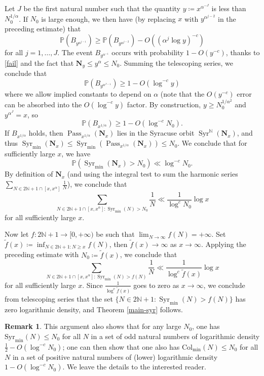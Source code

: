 \documentclass[12pt,a4paper,reqno]{amsart}
\numberwithin{equation}{section}
\theoremstyle{plain}
\theoremstyle{definition}
\newtheorem{remark}[theorem]{Remark}
\renewcommand\P{\mathbb{P}}
\newcommand\N{\mathbb{N}}
\newcommand\Pass{{\operatorname{Pass}}}
\newcommand\Syr{{\operatorname{Syr}}}
\begin{document}
Let $J$ be the first natural number such that the quantity $y \coloneqq x^{\alpha^{-J}}$ is less than $N_0^{1/\alpha}$.  If $N_0$ is large enough, we then have (by replacing $x$ with $y^{\alpha^{j-2}}$ in the preceding estimate) that
$$
 \P( B_{y^{\alpha^{j-1}}} ) \geq
 \P( B_{y^{\alpha^{j-2}}} )
- O( (\alpha^j \log y)^{-c} )
$$
for all $j=1,\dots,J$.  The event $B_{y^{\alpha^{-1}}}$ occurs with probability $1 - O(y^{-c})$, thanks to \eqref{fail} and the fact that $\mathbf{N}_{y} \leq y^\alpha \leq N_0$.  Summing the telescoping series, we conclude that
$$
 \P( B_{y^{\alpha^{J-1}}} ) \geq 1 - O( \log^{-c} y )$$
where we allow implied constants to depend on $\alpha$ (note that the $O(y^{-c})$ error can be absorbed into the $O( \log^{-c} y )$ factor.    By construction, $y \geq N_0^{1/\alpha^2}$ and $y^{\alpha^J} = x$, so
$$
 \P( B_{x^{1/\alpha}} ) \geq 1 - O( \log^{-c} N_0 ).$$
If $B_{x^{1/\alpha}}$ holds, then $\Pass_{x^{1/\alpha}}( \mathbf{N}_x )$ lies in the Syracuse orbit $\Syr^\N(\mathbf{N}_x)$, and thus $\Syr_{\min}(\mathbf{N}_x) \leq \Syr_{\min}(\Pass_{x^{1/\alpha}}( \mathbf{N}_x )) \leq N_0$.  We conclude that for sufficiently large $x$, we have
$$ \P( \Syr_{\min}(\mathbf{N}_x) > N_0 ) \ll \log^{-c} N_0.$$
By definition of $\mathbf{N}_x$ (and using the integral test to sum the harmonic series $\sum_{N \in 2\N+1 \cap [x,x^\alpha]} \frac{1}{N}$), we conclude that
$$ \sum_{N \in 2\N+1 \cap [x,x^\alpha]: \Syr_{\min}(N) > N_0} \frac{1}{N} \ll \frac{1}{\log^c N_0} \log x$$
for all sufficiently large $x$.

Now let $f\colon 2\N+1 \to [0,+\infty)$ be such that $\lim_{N \to \infty} f(N) = +\infty$.  Set $\tilde f(x) \coloneqq \inf_{N \in 2\N+1: N \geq x} f(N)$, then $\tilde f(x) \to \infty$ as $x \to \infty$.  Applying the preceding estimate with $N_0 \coloneqq \tilde f(x)$, we conclude that
$$ \sum_{N \in 2\N+1 \cap [x,x^\alpha]: \Syr_{\min}(N) > f(N)} \frac{1}{N} \ll \frac{1}{\log^c \tilde f(x)} \log x$$
for all sufficiently large $x$.  Since $\frac{1}{\log^c\tilde f(x)}$ goes to zero as $x \to \infty$, we conclude from telescoping series that the set $\{ N \in 2\N+1: \Syr_{\min}(N) > f(N) \}$ has zero logarithmic density, and Theorem \ref{main-syr} follows.

\begin{remark}  This argument also shows that for any large $N_0$, one has $\mathrm{Syr}_{\min}(N) \leq N_0$ for all $N$ in a set of odd natural numbers of logarithmic density $\frac{1}{2} - O( \log^{-c} N_0)$; one can then show that one also has $\mathrm{Col}_{\min}(N) \leq N_0$ for all $N$ in a set of positive natural numbers of (lower) logarithmic density $1 - O( \log^{-c} N_0)$.  We leave the details to the interested reader.
\end{remark}
\end{document}

